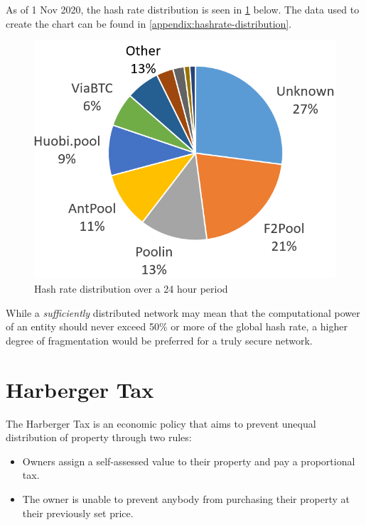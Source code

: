 As of 1 Nov 2020, the hash rate distribution is seen in \cref{figure:hashrate-distribution} below. The data used to create the chart can be found in \cref{appendix:hashrate-distribution}.

\begin{figure}[H]
  \centering
  \caption{Hash rate distribution over a 24 hour period}
  \label{figure:hashrate-distribution}
  \includegraphics[scale=0.5]{media/hashrate-distribution.PNG}
\end{figure}

While a \textit{sufficiently} distributed network may mean that the computational power of an entity should never exceed 50\% or more of the global hash rate, a higher degree of fragmentation would be preferred for a truly secure network.

\section{Harberger Tax}
\label{section:harberger-tax}

The Harberger Tax \cite{posnerweyl2017} is an economic policy that aims to prevent unequal distribution of property through two rules:

\begin{itemize}
  \item Owners assign a self-assessed value to their property and pay a proportional tax.
  \item The owner is unable to prevent anybody from purchasing their property at their previously set price.
\end{itemize}

